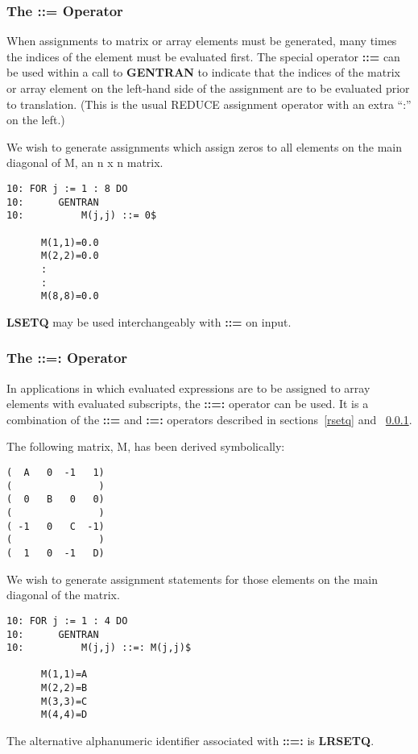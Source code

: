 \subsubsection{The ::= Operator}
\label{lsetq}
When assignments to matrix or array elements must be generated, many
times the indices of the element must be evaluated first.  The special operator
\index{::=} 
{\bf ::=} can be used within a call to {\bf GENTRAN}
to indicate that the indices of the matrix or
array element on the left-hand side of the assignment are to
be evaluated prior to translation.  (This is the usual REDUCE
assignment operator with an extra ``:'' on the left.)
\begin{describe}{\example}
We wish to generate assignments which assign zeros to all elements
on the main diagonal of M, an n x n matrix.
\begin{verbatim}
10: FOR j := 1 : 8 DO
10:      GENTRAN
10:          M(j,j) ::= 0$

      M(1,1)=0.0
      M(2,2)=0.0
      :
      :
      M(8,8)=0.0
\end{verbatim}
\end{describe}

{\bf LSETQ} may be used interchangeably with {\bf ::=} on input.
\subsubsection{The ::=: Operator}
\label{lrsetq}
\index{::=:}  
In applications in which evaluated expressions are to be assigned to
array elements with evaluated subscripts, the {\bf ::=:} operator can be
used.  It is a combination of the {\bf ::=} and {\bf :=:} operators described
in sections~\ref{rsetq} and ~\ref{lsetq}.

\newpage
\begin{describe}{\example}
The following matrix, M, has been derived symbolically:
\begin{verbatim}
(  A   0  -1   1)
(               )
(  0   B   0   0)
(               )
( -1   0   C  -1)
(               )
(  1   0  -1   D)
\end{verbatim}
We wish to generate assignment statements for those elements
on the main diagonal of the matrix.
\begin{verbatim}
10: FOR j := 1 : 4 DO
10:      GENTRAN
10:          M(j,j) ::=: M(j,j)$

      M(1,1)=A
      M(2,2)=B
      M(3,3)=C
      M(4,4)=D
\end{verbatim}
\end{describe}
The alternative alphanumeric identifier associated with {\bf ::=:} is
{\bf LRSETQ}.

